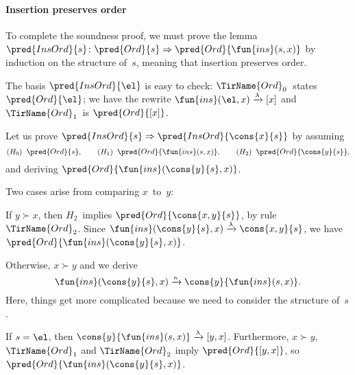 \paragraph{Insertion preserves order}

To complete the soundness proof, we must prove the
lemma~\(\pred{InsOrd}{s} \colon \pred{Ord}{s} \Rightarrow
\pred{Ord}{\fun{ins}(s,x)}\) by induction on the
structure of~\(s\), meaning that insertion
preserves order.

\begin{itemize*}

  \item The basis \(\pred{InsOrd}{\el}\) is easy to check:
    \(\TirName{Ord}_0\)~states \(\pred{Ord}{\el}\); we have the
    rewrite \(\fun{ins}(\el,x) \xrightarrow{\smash{\lambda}} [x]\) and
    \(\TirName{Ord}_1\)~is \(\pred{Ord}{[x]}\).

  \item Let us prove \(\pred{InsOrd}{s} \Rightarrow
    \pred{InsOrd}{\cons{x}{s}}\) by assuming
    \begin{equation*}
      (H_0) \;\; \pred{Ord}{s},\qquad
      (H_1) \;\; \pred{Ord}{\fun{ins}(s,x)},\qquad
      (H_2) \;\; \pred{Ord}{\cons{y}{s}},
    \end{equation*}
    and deriving \(\pred{Ord}{\fun{ins}(\cons{y}{s},x)}\).

    \noindent Two cases arise from comparing \(x\)~to~\(y\):
    \begin{itemize*}

      \item If \(y \succ x\), then \(H_2\)~implies
        \(\pred{Ord}{\cons{x,y}{s}}\), by rule
        \(\TirName{Ord}_2\). Since \(\fun{ins}(\cons{y}{s},x)
        \xrightarrow{\smash{\lambda}} \cons{x,y}{s}\), we have
        \(\pred{Ord}{\fun{ins}(\cons{y}{s},x)}\).

      \item Otherwise, \(x \succ y\) and we derive
        \begin{equation}
          \fun{ins}(\cons{y}{s},x) \xrightarrow{\smash{\kappa}}
          \cons{y}{\fun{ins}(s,x)}.\label{eq:A}
        \end{equation}
        Here, things get more complicated because we need to consider
        the structure of~\(s\).
        \begin{itemize*}

        \item If \(s=\el\), then \(\cons{y}{\fun{ins}(s,x)}
          \xrightarrow{\smash{\lambda}} [y,x]\). Furthermore, \(x
          \succ y\), \(\TirName{Ord}_1\) and \(\TirName{Ord}_2\) imply
          \(\pred{Ord}{[y,x]}\), so
          \(\pred{Ord}{\fun{ins}(\cons{y}{s},x)}\).


\end{itemize*}
\end{itemize*}
\end{itemize*}

